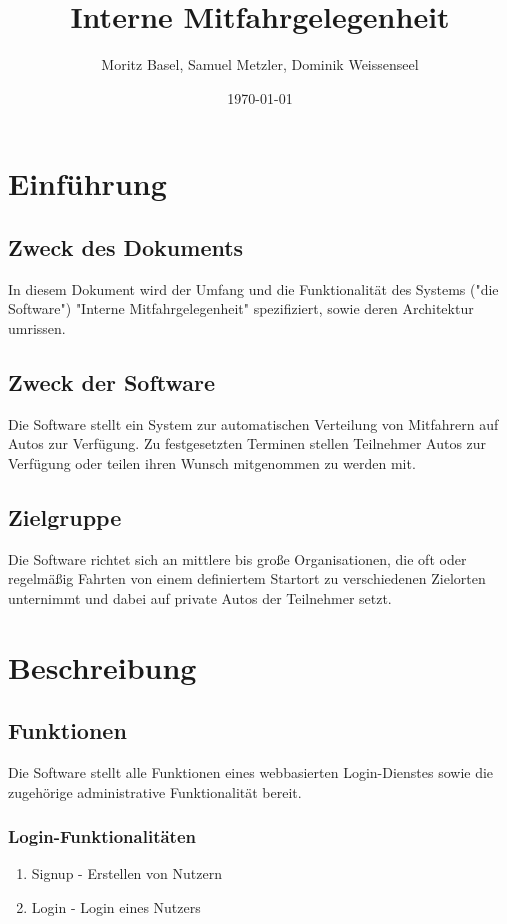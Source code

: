 \documentclass[11pt,a4paper]{article}
\author{Moritz Basel, Samuel Metzler, Dominik Weissenseel}
\title{Interne Mitfahrgelegenheit}
\date{\today{}}
\begin{document}
\normalfont


\maketitle{}
\tableofcontents{}

\section{Einführung}
\subsection{Zweck des Dokuments}
In diesem Dokument wird der Umfang und die Funktionalität des Systems ("die Software") "Interne Mitfahrgelegenheit" spezifiziert, sowie deren Architektur umrissen.
\subsection{Zweck der Software}
Die Software stellt ein System zur automatischen Verteilung von Mitfahrern auf Autos zur Verfügung. Zu festgesetzten Terminen stellen Teilnehmer Autos zur Verfügung oder teilen ihren Wunsch mitgenommen zu werden mit.
\subsection{Zielgruppe}
Die Software richtet sich an mittlere bis große Organisationen, die oft oder regelmäßig Fahrten von einem definiertem Startort zu verschiedenen Zielorten unternimmt und dabei auf private Autos der Teilnehmer setzt.

\section{Beschreibung}
\subsection{Funktionen}
Die Software stellt alle Funktionen eines webbasierten Login-Dienstes sowie die zugehörige administrative Funktionalität  bereit.
\subsubsection{Login-Funktionalitäten}
\begin{enumerate}
\item Signup - Erstellen von Nutzern
\item Login - Login eines Nutzers
\end{enumerate}
\end{document}
